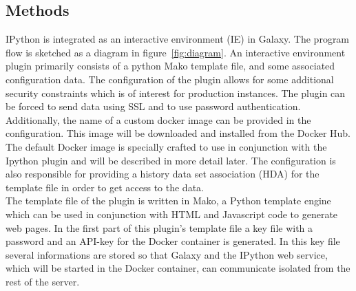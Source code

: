 \documentclass{bioinfo}
\begin{document}
\begin{methods}
\section{Methods}

IPython is integrated as an interactive environment (IE) in Galaxy. The program flow is sketched as a diagram in 
figure~\ref{fig:diagram}. An interactive environment plugin primarily consists of a python Mako template file, and some
associated configuration data. The configuration of the plugin allows for some additional security constraints which is 
of interest for production instances. The plugin can be forced to send data using SSL and to use password authentication.
Additionally, the name of a custom docker image can be provided in the configuration. This image will be downloaded and 
installed from the Docker Hub. The default Docker image is specially crafted to use in conjunction with the Ipython plugin
and will be described in more detail later. The configuration is also responsible for providing a history data set 
association (HDA) for the template file in order to get access to the data. \\
The template file of the plugin is written in Mako, a Python template engine which can be used in conjunction with HTML 
and Javascript code to generate web pages. In the first part of this plugin's template file a key file with a password
and an API-key for the Docker container is generated. In this key file several informations are stored so that Galaxy
and the IPython web service, which will be started in the Docker container, can communicate isolated from the rest of the server. %


\end{methods}
\end{document}
